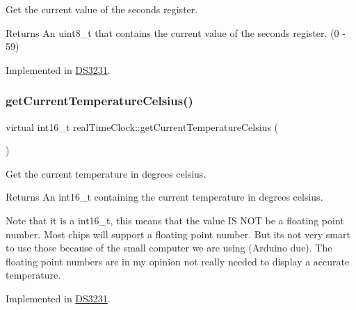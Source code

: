 Get the current value of the seconds register. 

\begin{DoxyReturn}{Returns}
An uint8\+\_\+t that contains the current value of the seconds register. (0 -\/ 59) 
\end{DoxyReturn}


Implemented in \mbox{\hyperlink{class_d_s3231_a8a5357eae07991d94f8f7610a3f3073a}{D\+S3231}}.

\mbox{\label{classreal_time_clock_ac662348fcf7b5fb51fdcf79f83958a33}} 
\subsubsection{\texorpdfstring{get\+Current\+Temperature\+Celsius()}{getCurrentTemperatureCelsius()}}
{\footnotesize\ttfamily virtual int16\+\_\+t real\+Time\+Clock\+::get\+Current\+Temperature\+Celsius (\begin{DoxyParamCaption}{ }\end{DoxyParamCaption})\hspace{0.3cm}{\ttfamily [pure virtual]}}



Get the current temperature in degrees celsius. 

\begin{DoxyReturn}{Returns}
An int16\+\_\+t containing the current temperature in degrees celsius.
\end{DoxyReturn}
Note that it is a int16\+\_\+t, this means that the value IS N\+OT be a floating point number. Most chips will support a floating point number. But it\textquotesingle{}s not very smart to use those because of the small computer we are using (Arduino due). The floating point numbers are in my opinion not really needed to display a accurate temperature. 

Implemented in \mbox{\hyperlink{class_d_s3231_abd46c1cf5f5c78e3222c3677e70a1272}{D\+S3231}}.

\mbox{\label{classreal_time_clock_a8fe956100fc4e339cd68ab413465f666}} 
